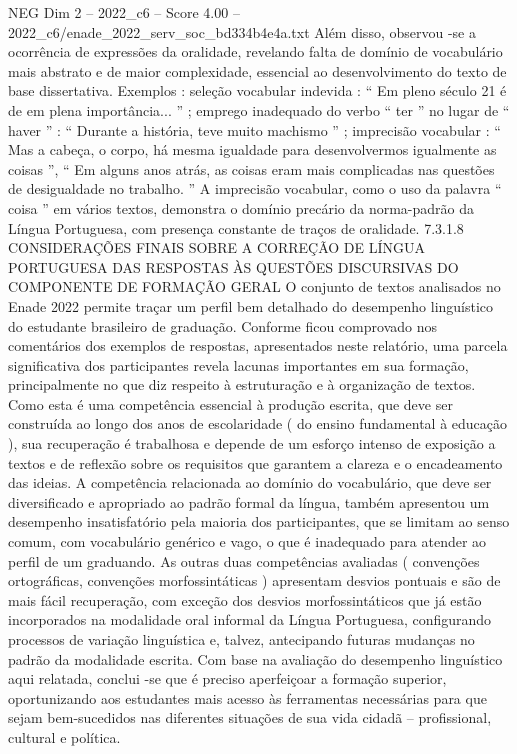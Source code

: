 \begin{textsample}{NEG Dim 2 – 2022\_c6 – Score 4.00 – 2022\_c6/enade\_2022\_serv\_soc\_bd334b4e4a.txt}
Além disso, observou -se a ocorrência de expressões da oralidade, revelando falta de domínio de vocabulário mais abstrato e de maior complexidade, essencial ao desenvolvimento do texto de base dissertativa.
Exemplos : seleção vocabular indevida : “ Em pleno século 21 é de em plena importância... ” ; emprego inadequado do verbo “ ter ” no lugar de “ haver ” : “ Durante a história, teve muito machismo ” ; imprecisão vocabular : “ Mas a cabeça, o corpo, há mesma igualdade para desenvolvermos igualmente as coisas ”, “ Em alguns anos atrás, as coisas eram mais complicadas nas questões de desigualdade no trabalho. ” A imprecisão vocabular, como o uso da palavra “ coisa ” em vários textos, demonstra o domínio precário da norma-padrão da Língua Portuguesa, com presença constante de traços de oralidade. 7.3.1.8 CONSIDERAÇÕES FINAIS SOBRE A CORREÇÃO DE LÍNGUA PORTUGUESA DAS RESPOSTAS ÀS QUESTÕES DISCURSIVAS DO COMPONENTE DE FORMAÇÃO GERAL O conjunto de textos analisados no Enade 2022 permite traçar um perfil bem detalhado do desempenho linguístico do estudante brasileiro de graduação.
Conforme ficou comprovado nos comentários dos exemplos de respostas, apresentados neste relatório, uma parcela significativa dos participantes revela lacunas importantes em sua formação, principalmente no que diz respeito à estruturação e à organização de textos.
Como esta é uma competência essencial à produção escrita, que deve ser construída ao longo dos anos de escolaridade ( do ensino fundamental à educação ), sua recuperação é trabalhosa e depende de um esforço intenso de exposição a textos e de reflexão sobre os requisitos que garantem a clareza e o encadeamento das ideias.
A competência relacionada ao domínio do vocabulário, que deve ser diversificado e apropriado ao padrão formal da língua, também apresentou um desempenho insatisfatório pela maioria dos participantes, que se limitam ao senso comum, com vocabulário genérico e vago, o que é inadequado para atender ao perfil de um graduando.
As outras duas competências avaliadas ( convenções ortográficas, convenções morfossintáticas ) apresentam desvios pontuais e são de mais fácil recuperação, com exceção dos desvios morfossintáticos que já estão incorporados na modalidade oral informal da Língua Portuguesa, configurando processos de variação linguística e, talvez, antecipando futuras mudanças no padrão da modalidade escrita.
Com base na avaliação do desempenho linguístico aqui relatada, conclui -se que é preciso aperfeiçoar a formação superior, oportunizando aos estudantes mais acesso às ferramentas necessárias para que sejam bem-sucedidos nas diferentes situações de sua vida cidadã – profissional, cultural e política.

\end{textsample}
